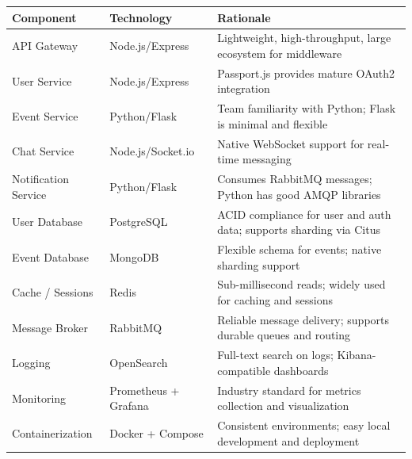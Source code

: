 \documentclass[12pt,a4paper]{article}
\begin{document}
\begin{longtable}{p{3.5cm}p{3cm}p{6.5cm}}
\toprule
\textbf{Component} & \textbf{Technology} & \textbf{Rationale} \\
\midrule
\endhead
API Gateway & Node.js/Express & Lightweight, high-throughput, large ecosystem for middleware \\
\midrule
User Service & Node.js/Express & Passport.js provides mature OAuth2 integration \\
\midrule
Event Service & Python/Flask & Team familiarity with Python; Flask is minimal and flexible \\
\midrule
Chat Service & Node.js/Socket.io & Native WebSocket support for real-time messaging \\
\midrule
Notification Service & Python/Flask & Consumes RabbitMQ messages; Python has good AMQP libraries \\
\midrule
User Database & PostgreSQL & ACID compliance for user and auth data; supports sharding via Citus \\
\midrule
Event Database & MongoDB & Flexible schema for events; native sharding support \\
\midrule
Cache / Sessions & Redis & Sub-millisecond reads; widely used for caching and sessions \\
\midrule
Message Broker & RabbitMQ & Reliable message delivery; supports durable queues and routing \\
\midrule
Logging & OpenSearch & Full-text search on logs; Kibana-compatible dashboards \\
\midrule
Monitoring & Prometheus + Grafana & Industry standard for metrics collection and visualization \\
\midrule
Containerization & Docker + Compose & Consistent environments; easy local development and deployment \\
\bottomrule
\end{longtable}
\end{document}

